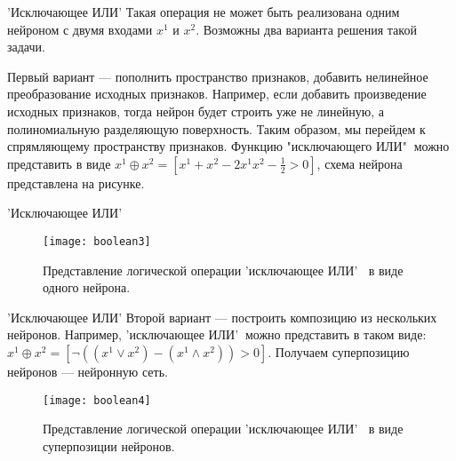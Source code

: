 \documentclass[11pt]{beamer}
\begin{document}
	\begin{frame}{'Исключающее ИЛИ'}
		Такая операция не может быть реализована одним нейроном с двумя входами $x^1$ и $x^2$. Возможны два варианта решения такой задачи. 
		
		Первый вариант --- пополнить пространство признаков, добавить нелинейное преобразование исходных признаков. Например, если добавить произведение исходных признаков, тогда нейрон будет строить уже не линейную, а полиномиальную разделяющую поверхность. Таким образом, мы перейдем к спрямляющему пространству признаков. Функцию "исключающего ИЛИ"$~$ можно представить в виде $x^1 \oplus x^2 = [x^1+x^2 -2x^1x^2-\frac{1}{2}>0]$, схема нейрона представлена на рисунке.
	\end{frame}

	\begin{frame}{'Исключающее ИЛИ'}
		\begin{figure}[H]
			\begin{center}
					\texttt{[image: boolean3]}
					\caption{Представление логической операции 'исключающее ИЛИ' $~$ в виде одного нейрона.}
					\label{bool3}
			\end{center}
		\end{figure}
	\end{frame}

	\begin{frame}{'Исключающее ИЛИ'}
		Второй вариант --- построить композицию из нескольких нейронов. Например, 'исключающее ИЛИ'$~$ можно представить в таком виде: $x^1 \oplus x^2 = [\lnot((x^1\lor x^2) - (x^1 \wedge x^2))>0]$. Получаем суперпозицию нейронов --- нейронную сеть.
		
		\begin{figure}[H]
			\begin{center}
					\texttt{[image: boolean4]}
					\caption{Представление логической операции 'исключающее ИЛИ' $~$ в виде суперпозиции нейронов.}
					\label{bool4}
			\end{center}
		\end{figure}
	\end{frame}
\end{document}
